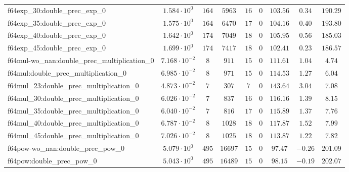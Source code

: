\begin{tabular}{|l|c|c|c|c|c|c|c|c|}
f64exp\_30:double\_prec\_exp\_0                & $ 1.584 \cdot 10^{0}  $ & $ 164    $ & $ 5963   $ & $ 16  $ & $ 0   $ & $ 103.56      $ & $ 0.34    $ & $ 190.29  $ \\
f64exp\_35:double\_prec\_exp\_0                & $ 1.575 \cdot 10^{0}  $ & $ 164    $ & $ 6470   $ & $ 17  $ & $ 0   $ & $ 104.16      $ & $ 0.40    $ & $ 193.80  $ \\
f64exp\_40:double\_prec\_exp\_0                & $ 1.642 \cdot 10^{0}  $ & $ 174    $ & $ 7049   $ & $ 18  $ & $ 0   $ & $ 105.95      $ & $ 0.56    $ & $ 185.03  $ \\
f64exp\_45:double\_prec\_exp\_0                & $ 1.699 \cdot 10^{0}  $ & $ 174    $ & $ 7417   $ & $ 18  $ & $ 0   $ & $ 102.41      $ & $ 0.23    $ & $ 186.57  $ \\
f64mul-wo\_nan:double\_prec\_multiplication\_0 & $ 7.168 \cdot 10^{-2} $ & $ 8      $ & $ 911    $ & $ 15  $ & $ 0   $ & $ 111.61      $ & $ 1.04    $ & $ 4.74    $ \\
f64mul:double\_prec\_multiplication\_0         & $ 6.985 \cdot 10^{-2} $ & $ 8      $ & $ 971    $ & $ 15  $ & $ 0   $ & $ 114.53      $ & $ 1.27    $ & $ 6.04    $ \\
f64mul\_23:double\_prec\_multiplication\_0     & $ 4.873 \cdot 10^{-2} $ & $ 7      $ & $ 307    $ & $ 7   $ & $ 0   $ & $ 143.64      $ & $ 3.04    $ & $ 7.08    $ \\
f64mul\_30:double\_prec\_multiplication\_0     & $ 6.026 \cdot 10^{-2} $ & $ 7      $ & $ 837    $ & $ 16  $ & $ 0   $ & $ 116.16      $ & $ 1.39    $ & $ 8.15    $ \\
f64mul\_35:double\_prec\_multiplication\_0     & $ 6.040 \cdot 10^{-2} $ & $ 7      $ & $ 816    $ & $ 17  $ & $ 0   $ & $ 115.89      $ & $ 1.37    $ & $ 7.76    $ \\
f64mul\_40:double\_prec\_multiplication\_0     & $ 6.787 \cdot 10^{-2} $ & $ 8      $ & $ 1028   $ & $ 18  $ & $ 0   $ & $ 117.87      $ & $ 1.52    $ & $ 7.99    $ \\
f64mul\_45:double\_prec\_multiplication\_0     & $ 7.026 \cdot 10^{-2} $ & $ 8      $ & $ 1025   $ & $ 18  $ & $ 0   $ & $ 113.87      $ & $ 1.22    $ & $ 7.82    $ \\
f64pow-wo\_nan:double\_prec\_pow\_0            & $ 5.079 \cdot 10^{0}  $ & $ 495    $ & $ 16697  $ & $ 15  $ & $ 0   $ & $ 97.47       $ & $ -0.26   $ & $ 201.09  $ \\
f64pow:double\_prec\_pow\_0                    & $ 5.043 \cdot 10^{0}  $ & $ 495    $ & $ 16489  $ & $ 15  $ & $ 0   $ & $ 98.15       $ & $ -0.19   $ & $ 202.07  $ \\

\end{tabular}
